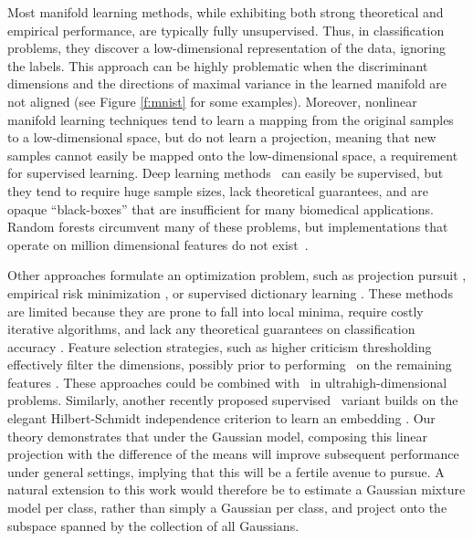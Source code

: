 \documentclass[11pt]{extarticle}
\begin{document}
Most manifold learning methods, while exhibiting both strong theoretical \cite{Eckart1936a,deSilva2003, Allard2012} and empirical performance, are typically fully unsupervised.  Thus, in classification problems, they discover a low-dimensional representation of the data, ignoring the labels.  This approach can be highly problematic when the discriminant dimensions and the directions of maximal variance in the learned manifold are not aligned (see Figure \ref{f:mnist} for some examples).
Moreover, nonlinear manifold learning techniques tend to learn a mapping from the original samples to a low-dimensional space, but do not learn a projection, meaning that new samples cannot easily be mapped onto the low-dimensional space, a requirement for supervised learning. Deep learning methods~\cite{Goodfellow2016-ac} can easily be supervised, but they tend to require huge sample sizes, lack theoretical guarantees, and are opaque ``black-boxes'' that are insufficient for many biomedical applications. Random forests circumvent many of these problems, but implementations that operate on million dimensional features do not exist~\cite{Tomita2017-mv}. 
%

%
Other approaches formulate an optimization problem, such as projection pursuit \cite{Huber1985a}, empirical risk minimization \cite{Belkin2006a}, or supervised dictionary learning \cite{Mairal2009}.  These methods are limited because they are prone to fall into local minima,  require costly iterative algorithms, and lack any theoretical guarantees on classification accuracy \cite{Belkin2006a}.
Feature selection strategies,  such as higher criticism thresholding \cite{Donoho2008a} effectively filter the dimensions, possibly prior to performing \Pca~on the remaining features \cite{Bair2006}. These approaches could be combined with \Lol~in ultrahigh-dimensional problems.
Similarly, another  recently proposed supervised \Pca~variant builds on the elegant Hilbert-Schmidt independence criterion \cite{Gretton05} to learn an embedding \cite{Barshan2011}.  Our theory demonstrates that under the Gaussian model, composing this linear projection with the difference of the means will improve subsequent performance under general settings, implying that this will be a fertile avenue to pursue. A natural extension to this work would therefore be to estimate a Gaussian mixture model per class, rather than simply a Gaussian per class, and project onto the subspace spanned by the collection of all Gaussians.
\end{document}
